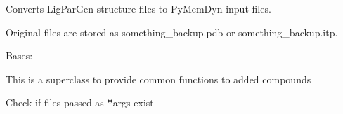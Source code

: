 \documentclass[letterpaper,10pt,english]{sphinxmanual}
\begin{document}
\begin{fulllineitems}
\begin{fulllineitems}
\end{fulllineitems}


\begin{fulllineitems}
\label{\detokenize{protein:protein.Sugar_prep.lpg2pmd}}
\pysigstartsignatures
{}
\pysigstopsignatures
\sphinxAtStartPar
Converts LigParGen structure files to PyMemDyn input files.

\sphinxAtStartPar
Original files are stored as something\_backup.pdb or something\_backup.itp.

\end{fulllineitems}


\end{fulllineitems}


\begin{fulllineitems}
\label{\detokenize{protein:protein.Compound}}
\pysigstartsignatures
{}
\pysigstopsignatures
\sphinxAtStartPar
Bases: 

\sphinxAtStartPar
This is a super\sphinxhyphen{}class to provide common functions to added compounds

\begin{fulllineitems}
\label{\detokenize{protein:protein.Compound.check_files}}
\pysigstartsignatures
{}
\pysigstopsignatures
\sphinxAtStartPar
Check if files passed as {\color{red}\bfseries{}*}args exist

\end{fulllineitems}


\end{fulllineitems}

\end{document}
